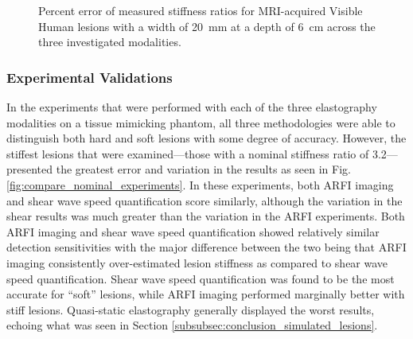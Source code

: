 			\begin{figure}[!htb]
				\centering
				\caption[Percent error of measured stiffness ratios for MRI-acquired Visible Human lesions across the three investigated modalities]{Percent error of measured stiffness ratios for MRI-acquired Visible Human lesions with a width of \SI{20}{\mm} at a depth of \SI{6}{\cm} across the three investigated modalities.}
				\label{fig:conclusions_human_pd}
			\end{figure}

		\FloatBarrier
		\subsubsection{Experimental Validations}
			In the experiments that were performed with each of the three elastography modalities on a tissue mimicking phantom, all three methodologies were able to distinguish both hard and soft lesions with some degree of accuracy. However, the stiffest lesions that were examined---those with a nominal stiffness ratio of 3.2---presented the greatest error and variation in the results as seen in Fig. \ref{fig:compare_nominal_experiments}. In these experiments, both ARFI imaging and shear wave speed quantification score similarly, although the variation in the shear results was much greater than the variation in the ARFI experiments. Both ARFI imaging and shear wave speed quantification showed relatively similar detection sensitivities with the major difference between the two being that ARFI imaging consistently over-estimated lesion stiffness as compared to shear wave speed quantification. Shear wave speed quantification was found to be the most accurate for ``soft'' lesions, while ARFI imaging performed marginally better with stiff lesions. Quasi-static elastography generally displayed the worst results, echoing what was seen in Section \ref{subsubsec:conclusion_simulated_lesions}.

